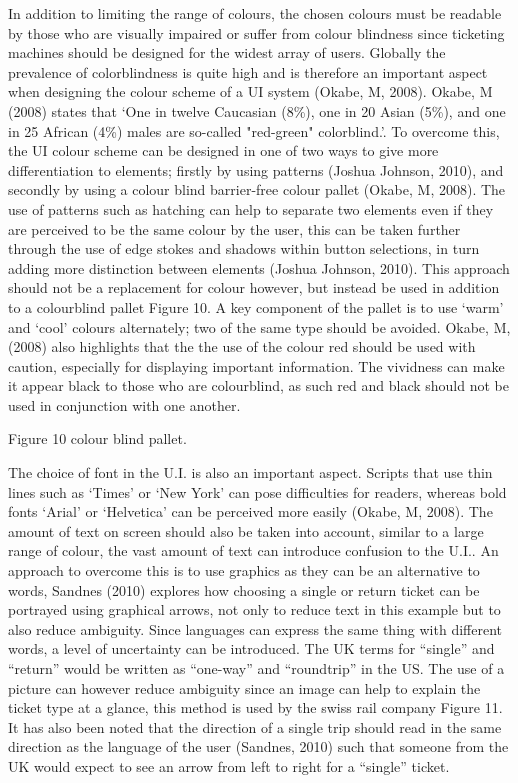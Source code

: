 In addition to limiting the range of colours, the chosen colours must be readable by those who are visually impaired or suffer from colour blindness since ticketing machines should be designed for the widest array of users. Globally the prevalence of colorblindness is quite high and is therefore an important aspect when designing the colour scheme of a UI system (Okabe, M, 2008). Okabe, M (2008) states that ‘One in twelve Caucasian (8\%), one in 20 Asian (5\%), and one in 25 African (4\%) males are so-called "red-green" colorblind.’. To overcome this, the UI colour scheme can be designed in one of two ways to give more differentiation to elements; firstly by using patterns (Joshua Johnson, 2010), and secondly by using a colour blind barrier-free colour pallet (Okabe, M, 2008). The use of patterns such as hatching can help to separate two elements even if they are perceived to be the same colour by the user, this can be taken further through the use of edge stokes and shadows within button selections, in turn adding more distinction between elements (Joshua Johnson, 2010). This approach should not be a replacement for colour however, but instead be used in addition to a colourblind pallet Figure 10. A key component of the pallet is to use ‘warm’ and ‘cool’ colours alternately; two of the same type should be avoided. Okabe, M, (2008) also highlights that the the use of the colour red should be used with caution, especially for displaying important information. The vividness can make it appear black to those who are colourblind, as such red and black should not be used in conjunction with one another.

Figure 10 colour blind pallet.

The choice of font in the U.I. is also an important aspect. Scripts that use thin lines such as ‘Times’ or ‘New York’ can pose difficulties for readers, whereas bold fonts ‘Arial’ or ‘Helvetica’ can be perceived more easily (Okabe, M, 2008). The amount of text on screen should also be taken into account, similar to a large range of colour, the vast amount of text can introduce confusion to the U.I.. An approach to overcome this is to use graphics as they can be an alternative to words, Sandnes (2010) explores how choosing a single or return ticket can be portrayed using graphical arrows, not only to reduce text in this example but to also reduce ambiguity. Since languages can express the same thing with different words, a level of uncertainty can be introduced. The UK terms for “single” and “return” would be written as  “one-way” and “roundtrip” in the US. The use of a picture can however reduce ambiguity since an image can help to explain the ticket type at a glance, this method is used by the swiss rail company Figure 11. It has also been noted that the direction of a single trip should read in the same direction as the language of the user (Sandnes, 2010) such that someone from the UK would expect to see an arrow from left to right for a “single” ticket.


